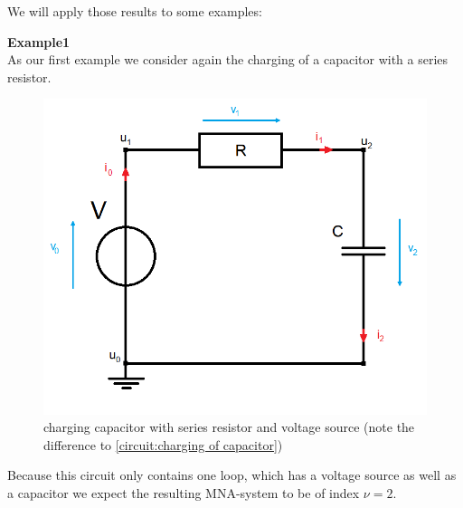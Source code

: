 We will apply those results to some examples: 

\textbf{Example1} \label{ex:Index_Analysis} \\
	As our first example we consider again the charging of a capacitor with a series resistor.
	\begin{figure}[H]
		\centering
		\includegraphics[scale = 0.4]{pictures/Example1_simple_p2.png}
		\caption{charging capacitor with series resistor and voltage source (note the difference to \ref{circuit:charging of capacitor})} 
	\end{figure}
	Because this circuit only contains one loop, which has a voltage source as well as a capacitor we expect the resulting MNA-system to be of index $\nu=2$. 
	
